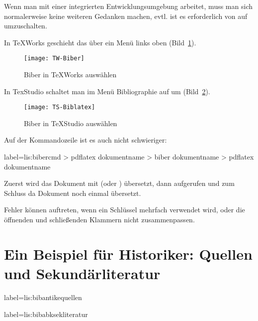 Wenn man mit einer integrierten Entwicklungsumgebung arbeitet, 
muss man sich normalerweise keine weiteren Gedanken machen,
evtl. ist es erforderlich von  auf  umzuschalten.

In TeXWorks geschieht das über ein Menü links oben (Bild~\ref{fig:lis:TWbiber}).

\begin{figure}
  \texttt{[image: TW-Biber]}
  \caption{Biber in TeXWorks auswählen}
  \label{fig:lis:TWbiber}
\end{figure}

In TexStudio schaltet man im Menü Bibliographie auf \BibLaTeX{} um (Bild~\ref{fig:lis:TSbiblatex}).

\begin{figure}
  \texttt{[image: TS-Biblatex]}
  \caption{Biber in TeXStudio auswählen}
  \label{fig:lis:TSbiblatex}
\end{figure}

Auf der Kommandozeile ist es auch nicht schwieriger:

\begin{lfgwcode}{label={lis:bibercmd}}
> pdflatex dokumentname
> biber dokumentname
> pdflatex dokumentname
\end{lfgwcode}

Zuerst wird das Dokument mit  (oder ) übersetzt,
dann \biber{} aufgerufen und zum Schluss da Dokument noch einmal übersetzt.

Fehler können auftreten, wenn ein Schlüssel mehrfach verwendet wird, 
oder die öffnenden und schließenden Klammern nicht zusammenpassen.

\section{Ein Beispiel für Historiker: Quellen und Sekundärliteratur}\label{sec:bibliografie}




\begin{lfgwcode}{label={lis:bibantikequellen}}
\printbibliography[%
  heading=subbibliography,
  keyword=ancient,%
  title={Antike Quellen}]
\end{lfgwcode}

\begin{lfgwcode}{label={lis:bibabksekliteratur}}
\printbibliography[%
  heading=subbibliography,
  keyword=corpus,%
  title={Abkürzungen und Sigel}]

\printbibliography[%
  heading=subbibliography,
  notkeyword=ancient,%
  notkeyword=corpus,%
  title={Sekundärliteratur}]
\end{lfgwcode}


